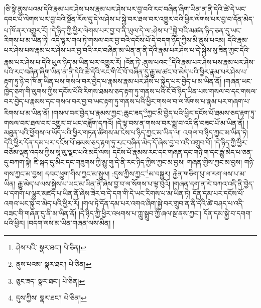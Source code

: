 །ཅི་སྟེ་ནུས་པའམ་དེའི་རྣམ་པར་ཤེས་པས་རྣམ་པར་ཤེས་པར་བྱ་བའི་རང་བཞིན་ཞིག་ཡིན་ན་ནི་དེའི་ཚེ་དེ་ཡང་དབང་པོ་ལེགས་པར་བྱ་བའི་སྔོན་རོལ་དུ་དེ་ལ་ཤེས་པ་སྐྱེ་བར་ཐལ་བར་འགྱུར་བའི་ཕྱིར་ལེགས་པར་བྱ་བ་དོན་མེད་པ་ཁོ་ནར་འགྱུར་རོ། །དེ་ཉིད་ཀྱི་ཕྱིར་ལེགས་པར་བྱ་བ་ནི་ཡུལ་དེ་ལ་:ཤེས་པ་\footnote{ཤེས་པའི་  སྣར་ཐང་།  པེ་ཅིན། }སྐྱེ་བའི་མཚན་ཉིད་ཅན་དུ་ཡང་རིགས་པ་མ་ཡིན་ཏེ། འདི་ལྟར་གལ་ཏེ་གསལ་བར་བྱ་བའི་དངོས་པོ་དེ་བདག་ཉིད་ཀྱིས་མི་ནུས་པའམ། དེའི་རྣམ་པར་ཤེས་པས་རྣམ་པར་ཤེས་པར་བྱ་བའི་རང་བཞིན་མ་ཡིན་ན་ནི་དེའི་རྣམ་པར་ཤེས་པ་དེ་སྐྱེས་སུ་ཟིན་ཀྱང་དེའི་རྣམ་པར་ཤེས་པ་དེའི་ཡུལ་ཉིད་མ་ཡིན་པར་འགྱུར་རོ། །འོན་ཏེ་:ནུས་པའང་\footnote{ནུས་པའམ་  སྣར་ཐང་།  པེ་ཅིན། }དེའི་རྣམ་པར་ཤེས་པས་རྣམ་པར་ཤེས་པའི་རང་བཞིན་ཞིག་ཡིན་ན་ནི་དེའི་ཚེ་དེའི་རང་གི་ངོ་བོ་བཞིན་དུ་རྒྱུ་མ་ཚང་བ་མེད་པའི་ཕྱིར་རྣམ་པར་ཤེས་པ་རྟག་ཏུ་ཉེ་བ་ཁོ་ན་ཡིན་པས་གསལ་བར་བྱེད་པ་རྣམས་རྣམ་པར་ཤེས་པ་སྐྱེད་པར་བྱེད་པ་མ་ཡིན་ནོ། །གཞན་ཡང་ཁྱེད་ཅག་གི་ལུགས་ཀྱིས་དངོས་པོའི་རིགས་ཐམས་ཅད་རྟག་ཏུ་གནས་པའི་ངོ་བོ་ཉིད་ཡིན་པས་གསལ་བ་དང་གསལ་བར་བྱེད་པ་རྣམས་དང་གསལ་བར་བྱ་བ་ཡང་རྟག་ཏུ་གནས་པའི་ཕྱིར་གསལ་བ་ལ་སོགས་པ་རྣམ་པར་གཞག་པ་རིགས་པ་མ་ཡིན་ནོ། །གསལ་བར་བྱེད་པ་རྣམས་ཀྱང་:ཆུང་ཟད་\footnote{ཅུང་ཟད་  སྣར་ཐང་།  པེ་ཅིན། }ཀྱང་མི་བྱེད་པའི་ཕྱིར་དངོས་པོ་ཐམས་ཅད་རྟག་ཏུ་གསལ་བར་ཐལ་བར་འགྱུར་བ་ཡང་བཟློག་དཀའོ། །དེ་ལྟ་བས་ན་གསལ་བར་སྨྲ་བ་འདི་ནི་བཟང་པོ་མ་ཡིན་ནོ། །མཐུན་པའི་ཕྱོགས་ལ་ཡོད་པའི་ཕྱིར་གཏན་ཚིགས་མ་ངེས་པ་ཉིད་ཀྱང་མ་ཡིན་ལ། འགལ་བ་ཉིད་ཀྱང་མ་ཡིན་ཏེ། དེའི་ཕྱིར་དོན་དམ་པར་དངོས་པོ་ཐམས་ཅད་རྟག་ཏུ་རང་བཞིན་མེད་དོ་ཞེས་བྱ་བ་འདི་འགྲུབ་བོ། །དེ་ཉིད་ཀྱི་ཕྱིར་བཅོམ་ལྡན་འདས་ཀྱིས་སཱ་ལུ་ལྗང་པའི་མདོ་ལས། དངོས་པོ་རྣམས་རང་དང་གཞན་དང་གཉི་ག་དང་རྒྱུ་མེད་པ་ཅན་དུ་བཀག་སྟེ། ཇི་སྐད་དུ་མིང་དང་གཟུགས་ཀྱི་མྱུ་གུ་དེ་ནི་རང་ཉིད་ཀྱིས་ཀྱང་མ་བྱས། གཞན་གྱིས་ཀྱང་མ་བྱས། གཉི་གས་ཀྱང་མ་བྱས། དབང་ཕྱུག་གིས་ཀྱང་མ་སྤྲུལ། :དུས་ཀྱིས་ཀྱང་\footnote{དུས་ཀྱིས་  སྣར་ཐང་།  པེ་ཅིན། }མ་བསྒྱུར། རྐྱེན་གཅིག་པུ་ལ་རག་ལས་པ་མ་ཡིན། རྒྱུ་མེད་པ་ལས་སྐྱེས་པ་ཡང་མ་ཡིན་ནོ་ཞེས་བྱ་བ་ལ་སོགས་པ་ལྟ་བུའོ། །གཞན་དག་ན་རེ་བཀའ་འདི་ནི་བྱེད་པ་དགག་པ་ལྷུར་མཛད་པ་ཡིན་ནོ་ཞེས་ཟེར་བ་དེ་དག་གི་དེ་ཡང་རིགས་པ་མ་ཡིན་ཏེ། དོན་དམ་པར་དངོས་པོ་འགའ་ཡང་སྐྱེ་བ་མེད་པའི་ཕྱིར་རོ། །གལ་ཏེ་དོན་དམ་པར་འགའ་ཞིག་སྐྱེ་བར་གྲུབ་ན་ནི་དེའི་ཚེ་བཤད་པ་འདི་བཟང་གི་གཞན་དུ་ནི་མ་ཡིན་ནོ། །དེ་ཉིད་ཀྱི་ཕྱིར་འཕགས་པ་ཀླུ་སྒྲུབ་ཀྱི་ཞལ་སྔ་ནས་ཀྱང་། དོན་དམ་སྐྱེ་བ་དགག་པའི་ཕྱིར། །བདག་ལས་མ་ཡིན་གཞན་ལས་མིན། །
